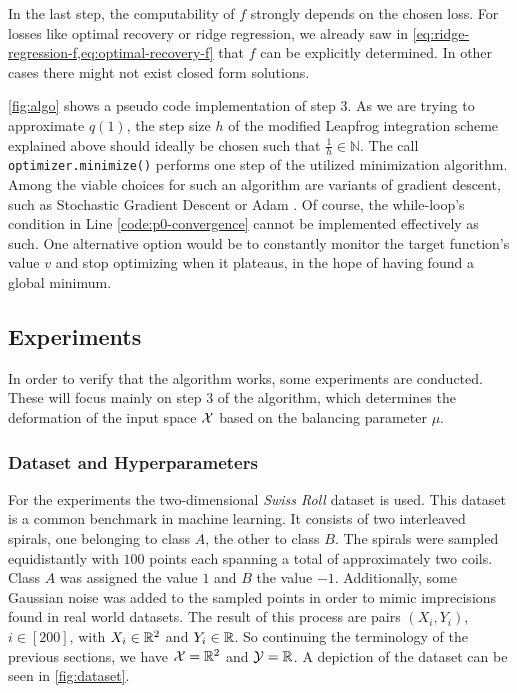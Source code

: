 In the last step, the computability of $f$ strongly depends on the chosen loss.
For losses like optimal recovery or ridge regression, we already saw in \cref{eq:ridge-regression-f,eq:optimal-recovery-f} that $f$ can be explicitly determined.
In other cases there might not exist closed form solutions.



\cref{fig:algo} shows a pseudo code implementation of step 3.
As we are trying to approximate $q(1)$, the step size $h$ of the modified Leapfrog integration scheme explained above should ideally be chosen such that $\frac{1}{h} \in \mathbb{N}$.
The call \texttt{optimizer.minimize()} performs one step of the utilized minimization algorithm.
Among the viable choices for such an algorithm are variants of gradient descent, such as Stochastic Gradient Descent or Adam \cite{kingma17}.
Of course, the while-loop's condition in Line \ref{code:p0-convergence} cannot be implemented effectively as such.
One alternative option would be to constantly monitor the target function's value $v$ and stop optimizing when it plateaus, in the hope of having found a global minimum.

\subsection{Experiments}

In order to verify that the algorithm works, some experiments are conducted.
These will focus mainly on step 3 of the algorithm, which determines the deformation of the input space $\mathcal{X}$ based on the balancing parameter $\mu$.

\subsubsection{Dataset and Hyperparameters}

For the experiments the two-dimensional \emph{Swiss Roll} dataset is used.
This dataset is a common benchmark in machine learning.
It consists of two interleaved spirals, one belonging to class $A$, the other to class $B$.
The spirals were sampled equidistantly with $100$ points each spanning a total of approximately two coils.
Class $A$ was assigned the value $1$ and $B$ the value $-1$.
Additionally, some Gaussian noise was added to the sampled points in order to mimic imprecisions found in real world datasets.
The result of this process are pairs $(X_i, Y_i)$, $i \in [200]$, with $X_i \in \mathbb{R}^2$ and $Y_i \in \mathbb{R}$.
So continuing the terminology of the previous sections, we have $\mathcal{X} = \mathbb{R}^2$ and $\mathcal{Y} = \mathbb{R}$.
A depiction of the dataset can be seen in \cref{fig:dataset}. 


